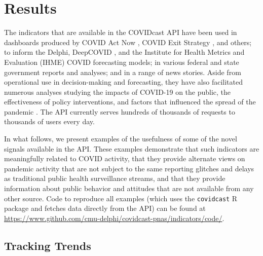 \documentclass[9pt,twocolumn,twoside,lineno]{pnas-new}
\begin{document}
\section{Results}

The indicators that are available in the COVIDcast API have been used in
dashboards produced by COVID Act Now \cite{CovidActNow}, COVID Exit Strategy
\cite{CovidExitStrategy}, and others; to inform the Delphi, DeepCOVID
\cite{Rodriguez:2021}, and the Institute for Health Metrics and Evaluation
(IHME) \cite{IHMEProj} COVID forecasting models; in various federal and state
government reports and analyses; and in a range of news stories. Aside from
operational use in decision-making and forecasting, they have also facilitated
numerous analyses studying the impacts of COVID-19 on the public, the
effectiveness of policy interventions, and factors that influenced the spread of
the pandemic \cite{Adjodah:2021, Pierri:2021, Jewell:2021, Chakrabarti:2020,
  Doerr:2021}. The API currently serves hundreds of thousands of requests to
thousands of users every day.

In what follows, we present examples of the usefulness of some of the novel
signals available in the API. These examples demonstrate that such indicators
are meaningfully related to COVID activity, that they provide alternate views on
pandemic activity that are not subject to the same reporting glitches and delays
as traditional public health surveillance streams, and that they provide
information about public behavior and attitudes that are not available from any
other source. Code to reproduce all examples (which uses the \texttt{covidcast}
R package and fetches data directly from the API) can be found at
\url{https://www.github.com/cmu-delphi/covidcast-pnas/indicators/code/}. 

\subsection{Tracking Trends}
\end{document}
